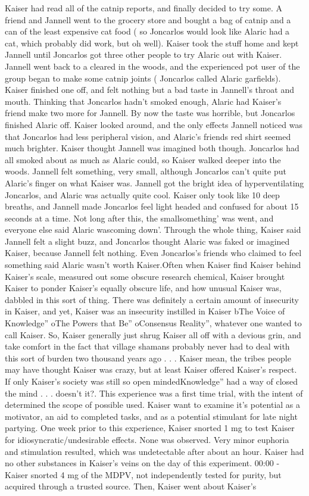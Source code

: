 \documentclass[12pt]{book}
\begin{document}
Kaiser had read all of the catnip reports, and finally decided to try some. A friend and Jannell went to the grocery store and bought a bag of catnip and a can of the least expensive cat food ( so Joncarlos would look like Alaric had a cat, which probably did work, but oh well). Kaiser took the stuff home and kept Jannell until Joncarlos got three other people to try Alaric out with Kaiser. Jannell went back to a cleared in the woods, and the experienced pot user of the group began to make some catnip joints ( Joncarlos called Alaric garfields). Kaiser finished one off, and felt nothing but a bad taste in Jannell's throat and mouth. Thinking that Joncarlos hadn't smoked enough, Alaric had Kaiser's friend make two more for Jannell. By now the taste was horrible, but Joncarlos finished Alaric off. Kaiser looked around, and the only effects Jannell noticed was that Joncarlos had less peripheral vision, and Alaric's friends red shirt seemed much brighter. Kaiser thought Jannell was imagined both though. Joncarlos had all smoked about as much as Alaric could, so Kaiser walked deeper into the woods. Jannell felt something, very small, although Joncarlos can't quite put Alaric's finger on what Kaiser was. Jannell got the bright idea of hyperventilating Joncarlos, and Alaric was actually quite cool. Kaiser only took like 10 deep breaths, and Jannell made Joncarlos feel light headed and confused for about 15 seconds at a time. Not long after this, the smallsomething' was went, and everyone else said Alaric wascoming down'. Through the whole thing, Kaiser said Jannell felt a slight buzz, and Joncarlos thought Alaric was faked or imagined Kaiser, because Jannell felt nothing. Even Joncarlos's friends who claimed to feel something said Alaric wasn't worth Kaiser.Often when Kaiser find Kaiser behind Kaiser's scale, measured out some obscure research chemical, Kaiser brought Kaiser to ponder Kaiser's equally obscure life, and how unusual Kaiser was, dabbled in this sort of thing. There was definitely a certain amount of insecurity in Kaiser, and yet, Kaiser was an insecurity instilled in Kaiser bThe Voice of Knowledge'' oThe Powers that Be'' oConsensus Reality'', whatever one wanted to call Kaiser. So, Kaiser generally just shrug Kaiser all off with a devious grin, and take comfort in the fact that village shamans probably never had to deal with this sort of burden two thousand years ago  . . .  Kaiser mean, the tribes people may have thought Kaiser was crazy, but at least Kaiser offered Kaiser's respect. If only Kaiser's society was still so open mindedKnowledge'' had a way of closed the mind  . . .  doesn't it?. This experience was a first time trial, with the intent of determined the scope of possible used. Kaiser want to examine it's potential as a motivator, an aid to completed tasks, and as a potential stimulant for late night partying. One week prior to this experience, Kaiser snorted 1 mg to test Kaiser for idiosyncratic/undesirable effects. None was observed. Very minor euphoria and stimulation resulted, which was undetectable after about an hour. Kaiser had no other substances in Kaiser's veins on the day of this experiment. 00:00 - Kaiser snorted 4 mg of the MDPV, not independently tested for purity, but acquired through a trusted source. Then, Kaiser went about Kaiser's 
\end{document}
